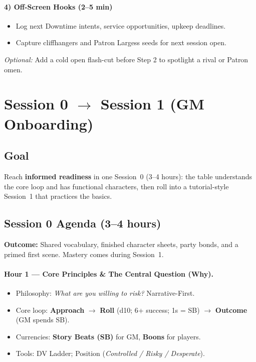 \paragraph{4) Off-Screen Hooks (2–5 min)}
\begin{itemize}
  \item Log next Downtime intents, service opportunities, upkeep deadlines.
  \item Capture cliffhangers and Patron Largess seeds for next session open.
\end{itemize}

\emph{Optional:} Add a cold open flash-cut before Step 2 to spotlight a rival or Patron omen.

\section{Session 0 \texorpdfstring{$\rightarrow$}{→} Session 1 (GM Onboarding)}
\label{sec:gm-session0-1}

\subsection*{Goal}
Reach \textbf{informed readiness} in one Session~0 (3–4 hours): the table understands the core loop and has functional characters, then roll into a tutorial-style Session~1 that practices the basics.

\subsection*{Session 0 Agenda (3–4 hours)}
\begin{tcolorbox}[title={Overview},colback=gray!5,colframe=black]
\textbf{Outcome:} Shared vocabulary, finished character sheets, party bonds, and a primed first scene. Mastery comes during Session~1.
\end{tcolorbox}

\paragraph{Hour 1 — Core Principles \& The Central Question (Why).}
\begin{itemize}
  \item Philosophy: \emph{What are you willing to risk?} Narrative-First.
  \item Core loop: \textbf{Approach} $\rightarrow$ \textbf{Roll} (d10; 6+ success; 1s = SB) $\rightarrow$ \textbf{Outcome} (GM spends SB).
  \item Currencies: \textbf{Story Beats (SB)} for GM, \textbf{Boons} for players.
  \item Tools: DV Ladder; Position (\textit{Controlled / Risky / Desperate}).
\end{itemize}

